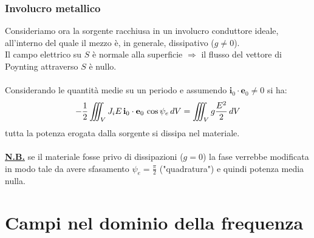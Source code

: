 \documentclass[a4paper]{article}
\begin{document}
\subsubsection*{Involucro metallico}
Consideriamo ora la sorgente racchiusa in un involucro conduttore ideale, all'interno del quale il mezzo è, in generale, dissipativo ($g\neq0$).\\Il campo elettrico su $S$ è normale alla superficie $\Rightarrow$ il flusso del vettore di Poynting attraverso $S$ è nullo.\\\\
Considerando le quantità medie su un periodo e assumendo $\textbf{i}_0\cdot\textbf{e}_0\neq0$ si ha:
\begin{equation*}
-\frac{1}{2}\iiint_{V}J_iE\,\textbf{i}_0\cdot\textbf{e}_0\,\cos\psi_e\,dV=\iiint_{V}g\frac{E^2}{2}\,dV\\
\end{equation*}
tutta la potenza erogata dalla sorgente si dissipa nel materiale.\\\\
\underline{\textbf{N.B.}} se il materiale fosse privo di dissipazioni ($g=0$) la fase verrebbe modificata in modo tale da avere sfasamento $\psi_e = \frac{\pi}{2}$ ("quadratura") e quindi potenza media nulla.
\section{Campi nel dominio della frequenza}
\end{document}

